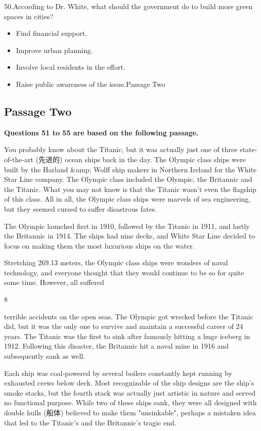 \documentclass[UTF8,11pt]{ctexart}
\begin{document}
50.According to Dr. White, what should the government do to build more green spaces in cities?


\begin{itemize}[leftmargin=2em,itemsep=.2em,topsep=.4em]\item[A.] Find financial support.
\item[B.] Improve urban planning.
\item[C.] Involve local residents in the effort.
\item[D.] Raise public awareness of the issue.Passage Two
\end{itemize}

\subsection*{\textbf{Passage Two}}


\textbf{Questions 51 to 55 are based on the following passage.}


You probably know about the Titanic, but it was actually just one of three state-of-the-art (先进的) ocean ships back in the day. The Olympic class ships were built by the Harland \&amp; Wolff ship makers in Northern Ireland for the White Star Line company. The Olympic class included the Olympic, the Britannic and the Titanic. What you may not know is that the Titanic wasn't even the flagship of this class. All in all, the Olympic class ships were marvels of sea engineering, but they seemed cursed to suffer disastrous fates.


The Olympic launched first in 1910, followed by the Titanic in 1911, and lastly the Britannic in 1914. The ships had nine decks, and White Star Line decided to focus on making them the most luxurious ships on the water.


Stretching 269.13 meters, the Olympic class ships were wonders of naval technology, and everyone thought that they would continue to be so for quite some time. However, all suffered


8


terrible accidents on the open seas. The Olympic got wrecked before the Titanic did, but it was the only one to survive and maintain a successful career of 24 years. The Titanic was the first to sink after famously hitting a huge iceberg in 1912. Following this disaster, the Britannic hit a naval mine in 1916 and subsequently sank as well.


Each ship was coal-powered by several boilers constantly kept running by exhausted crews below deck. Most recognizable of the ship designs are the ship's smoke stacks, but the fourth stack was actually just artistic in nature and served no functional purpose. While two of these ships sank, they were all designed with double hulls (船体) believed to make them "unsinkable", perhaps a mistaken idea that led to the Titanic's and the Britannic's tragic end.
\end{document}
